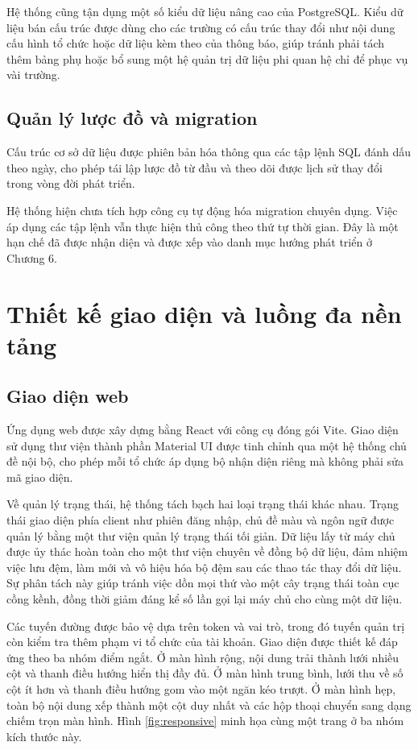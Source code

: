 \documentclass[12pt,a4paper,oneside]{report}
\begin{document}
Hệ thống cũng tận dụng một số kiểu dữ liệu nâng cao của PostgreSQL. Kiểu dữ liệu bán cấu trúc được dùng cho các trường có cấu trúc thay đổi như nội dung cấu hình tổ chức hoặc dữ liệu kèm theo của thông báo, giúp tránh phải tách thêm bảng phụ hoặc bổ sung một hệ quản trị dữ liệu phi quan hệ chỉ để phục vụ vài trường.

\subsection{Quản lý lược đồ và migration}

Cấu trúc cơ sở dữ liệu được phiên bản hóa thông qua các tập lệnh SQL đánh dấu theo ngày, cho phép tái lập lược đồ từ đầu và theo dõi được lịch sử thay đổi trong vòng đời phát triển.

Hệ thống hiện chưa tích hợp công cụ tự động hóa migration chuyên dụng. Việc áp dụng các tập lệnh vẫn thực hiện thủ công theo thứ tự thời gian. Đây là một hạn chế đã được nhận diện và được xếp vào danh mục hướng phát triển ở Chương 6.

\section{Thiết kế giao diện và luồng đa nền tảng}

\subsection{Giao diện web}

Ứng dụng web được xây dựng bằng React với công cụ đóng gói Vite. Giao diện sử dụng thư viện thành phần Material UI được tinh chỉnh qua một hệ thống chủ đề nội bộ, cho phép mỗi tổ chức áp dụng bộ nhận diện riêng mà không phải sửa mã giao diện.

Về quản lý trạng thái, hệ thống tách bạch hai loại trạng thái khác nhau. Trạng thái giao diện phía client như phiên đăng nhập, chủ đề màu và ngôn ngữ được quản lý bằng một thư viện quản lý trạng thái tối giản. Dữ liệu lấy từ máy chủ được ủy thác hoàn toàn cho một thư viện chuyên về đồng bộ dữ liệu, đảm nhiệm việc lưu đệm, làm mới và vô hiệu hóa bộ đệm sau các thao tác thay đổi dữ liệu. Sự phân tách này giúp tránh việc dồn mọi thứ vào một cây trạng thái toàn cục cồng kềnh, đồng thời giảm đáng kể số lần gọi lại máy chủ cho cùng một dữ liệu.

Các tuyến đường được bảo vệ dựa trên token và vai trò, trong đó tuyến quản trị còn kiểm tra thêm phạm vi tổ chức của tài khoản. Giao diện được thiết kế đáp ứng theo ba nhóm điểm ngắt. Ở màn hình rộng, nội dung trải thành lưới nhiều cột và thanh điều hướng hiển thị đầy đủ. Ở màn hình trung bình, lưới thu về số cột ít hơn và thanh điều hướng gom vào một ngăn kéo trượt. Ở màn hình hẹp, toàn bộ nội dung xếp thành một cột duy nhất và các hộp thoại chuyển sang dạng chiếm trọn màn hình. Hình \ref{fig:responsive} minh họa cùng một trang ở ba nhóm kích thước này.
\end{document}
